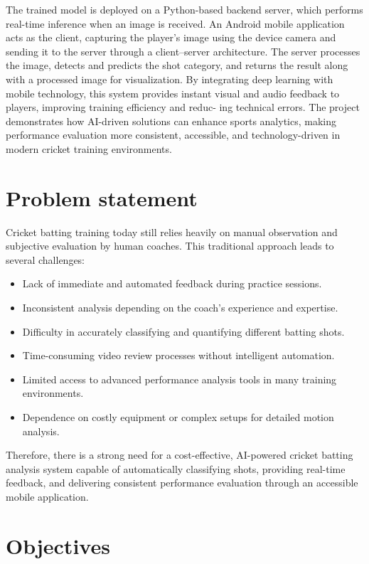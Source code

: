 The trained model is deployed on a Python-based backend
server, which performs real-time inference when an image is
received. An Android mobile application acts as the client,
capturing the player’s image using the device camera and
sending it to the server through a client–server architecture.
The server processes the image, detects and predicts the shot
category, and returns the result along with a processed image
for visualization. By integrating deep learning with mobile
technology, this system provides instant visual and audio
feedback to players, improving training efficiency and reduc-
ing technical errors. The project demonstrates how AI-driven
solutions can enhance sports analytics, making performance
evaluation more consistent, accessible, and technology-driven
in modern cricket training environments.

\section{Problem statement} \label{S1.2}
 Cricket batting training today still relies heavily on manual observation and subjective evaluation by human coaches. This traditional approach leads to several challenges:
 
 \begin{itemize}
 	\item Lack of immediate and automated feedback during practice sessions.
 	\item Inconsistent analysis depending on the coach’s experience and expertise.
 	\item Difficulty in accurately classifying and quantifying different batting shots.
 	\item Time-consuming video review processes without intelligent automation.
 	\item Limited access to advanced performance analysis tools in many training environments.
 	\item Dependence on costly equipment or complex setups for detailed motion analysis.
 \end{itemize}
 
 Therefore, there is a strong need for a cost-effective, AI-powered cricket batting analysis system capable of automatically classifying shots, providing real-time feedback, and delivering consistent performance evaluation through an accessible mobile application.


\section{Objectives} \label{S1.3} 

